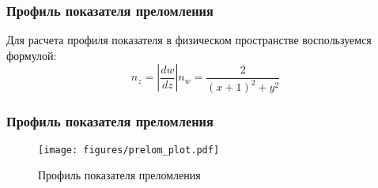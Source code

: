 \begin{frame}\frametitle{Профиль показателя преломления}
  Для расчета профиля показателя в физическом пространстве воспользуемся формулой:
  \begin{equation}
    n_z =
    \left|\frac{dw}{dz}\right| n_w =
    \frac{2}{(x+1)^2+y^2}
    \label{eq:pok_prelom}
  \end{equation}

\end{frame}

\begin{frame}\frametitle{Профиль показателя преломления}
  \begin{figure}
    \texttt{[image: figures/prelom\_plot.pdf]}
    \caption{Профиль показателя преломления}
  \end{figure}
\end{frame}
